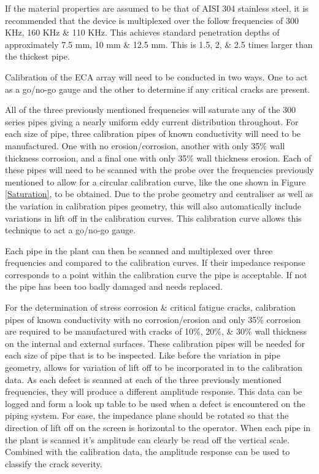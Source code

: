 \documentclass[a4paper,twoside,11pt]{article}
\begin{document}
If the material properties are assumed to be that of AISI 304 stainless steel, it is recommended that the device is multiplexed over the follow frequencies of 300 KHz, 160 KHz \& 110 KHz.
This achieves standard penetration depths of approximately 7.5 mm, 10 mm \& 12.5 mm. This is 1.5, 2, \& 2.5 times larger than the thickest pipe.
	
Calibration of the ECA array will need to be conducted in two ways. One to act as a go/no-go gauge and the other to determine if any critical cracks are present.
	
All of the three previously mentioned frequencies will saturate any of the 300 series pipes giving a nearly uniform eddy current distribution throughout.
For each size of pipe, three calibration pipes of known conductivity will need to be manufactured. One with no erosion/corrosion, another with only 35\% wall thickness corrosion, and a final one with only 35\% wall thickness erosion. 
Each of these pipes will need to be scanned with the probe over the frequencies previously mentioned to allow for a circular calibration curve, like the one shown in Figure \ref{Saturation}, to be obtained. 
Due to the probe geometry and centraliser as well as the variation in calibration pipes geometry, this will also automatically include variations in lift off in the calibration curves. 
This calibration curve allows this technique to act a go/no-go gauge. 

Each pipe in the plant can then be scanned and multiplexed over three frequencies and compared to the calibration curves. 
If their impedance response corresponds to a point within the calibration curve the pipe is acceptable.
If not the pipe has been too badly damaged and needs replaced. 
	
For the determination of stress corrosion \& critical fatigue cracks, calibration pipes of known conductivity with no corrosion/erosion and only 35\% corrosion are required to be manufactured with cracks of 10\%, 20\%, \& 30\% wall thickness on the internal and external surfaces. These calibration pipes will be needed for each size of pipe that is to be inspected. 
Like before the variation in pipe geometry, allows for variation of lift off to be incorporated in to the calibration data.  
As each defect is scanned at each of the three previously mentioned frequencies, they will produce a different amplitude response. 
This data can be logged and form a look up table to be used when a defect is encountered on the piping system.
For ease, the impedance plane should be rotated so that the direction of lift off on the screen is horizontal to the operator. 
When each pipe in the plant is scanned it's amplitude can clearly be read off the vertical scale.
Combined with the calibration data, the amplitude response can be used to classify the crack severity.
	
\end{document}
